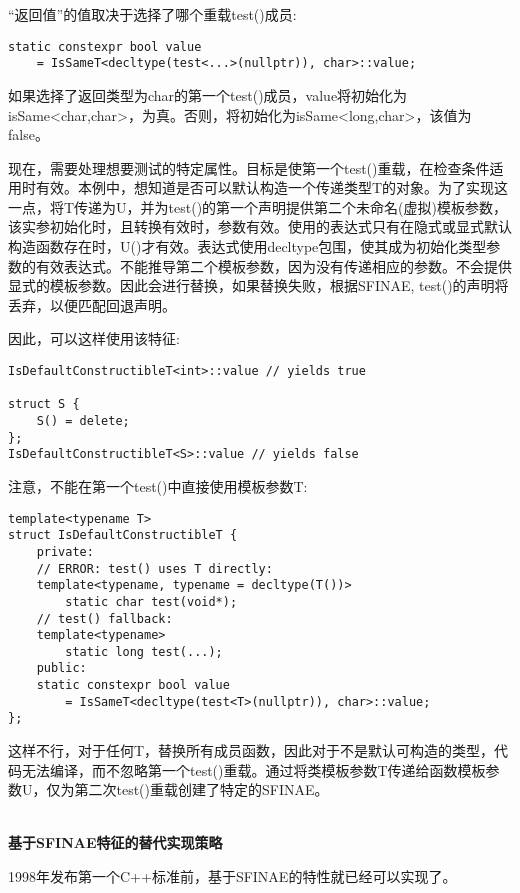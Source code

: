 “返回值”的值取决于选择了哪个重载test()成员:

\begin{lstlisting}[style=styleCXX]
static constexpr bool value
	= IsSameT<decltype(test<...>(nullptr)), char>::value;
\end{lstlisting}

如果选择了返回类型为char的第一个test()成员，value将初始化为isSame<char,char>，为真。否则，将初始化为isSame<long,char>，该值为false。

现在，需要处理想要测试的特定属性。目标是使第一个test()重载，在检查条件适用时有效。本例中，想知道是否可以默认构造一个传递类型T的对象。为了实现这一点，将T传递为U，并为test()的第一个声明提供第二个未命名(虚拟)模板参数，该实参初始化时，且转换有效时，参数有效。使用的表达式只有在隐式或显式默认构造函数存在时，U()才有效。表达式使用decltype包围，使其成为初始化类型参数的有效表达式。不能推导第二个模板参数，因为没有传递相应的参数。不会提供显式的模板参数。因此会进行替换，如果替换失败，根据SFINAE, test()的声明将丢弃，以便匹配回退声明。

因此，可以这样使用该特征:

\begin{lstlisting}[style=styleCXX]
IsDefaultConstructibleT<int>::value // yields true

struct S {
	S() = delete;
};
IsDefaultConstructibleT<S>::value // yields false
\end{lstlisting}

注意，不能在第一个test()中直接使用模板参数T:

\begin{lstlisting}[style=styleCXX]
template<typename T>
struct IsDefaultConstructibleT {
	private:
	// ERROR: test() uses T directly:
	template<typename, typename = decltype(T())>
		static char test(void*);
	// test() fallback:
	template<typename>
		static long test(...);
	public:
	static constexpr bool value
		= IsSameT<decltype(test<T>(nullptr)), char>::value;
};
\end{lstlisting}

这样不行，对于任何T，替换所有成员函数，因此对于不是默认可构造的类型，代码无法编译，而不忽略第一个test()重载。通过将类模板参数T传递给函数模板参数U，仅为第二次test()重载创建了特定的SFINAE。

\hspace*{\fill} \\ %
\noindent
\textbf{基于SFINAE特征的替代实现策略}

1998年发布第一个C++标准前，基于SFINAE的特性就已经可以实现了。

